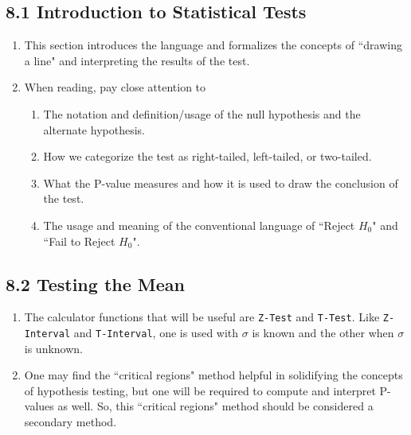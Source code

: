 \documentclass{ccg-topic}
\begin{document}
\subsection*{8.1 Introduction to Statistical Tests}

\begin{enumerate}

  \item This section introduces the language and formalizes the concepts of ``drawing a line" and interpreting the results of the test.
  
  \item When reading, pay close attention to
  
    \begin{enumerate}
    
      \item The notation and definition/usage of the null hypothesis and the alternate hypothesis. 
      
      \item How we categorize the test as right-tailed, left-tailed, or two-tailed.
      
      \item What the P-value measures and how it is used to draw the conclusion of the test.
      
      \item The usage and meaning of the conventional language of ``Reject $H_0$" and ``Fail to Reject $H_0$".
      
    \end{enumerate}
    
\end{enumerate}

\subsection*{8.2 Testing the Mean}

\begin{enumerate}

  \item The calculator functions that will be useful are \texttt{Z-Test} and \texttt{T-Test}. Like \texttt{Z-Interval} and \texttt{T-Interval}, one is used with $\sigma$ is known and the other when $\sigma$ is unknown.
  
  \item One may find the ``critical regions" method helpful in solidifying the concepts of hypothesis testing, but one will be required to compute and interpret P-values as well. So, this ``critical regions" method should be considered a secondary method.
  
\end{enumerate}
\end{document}
